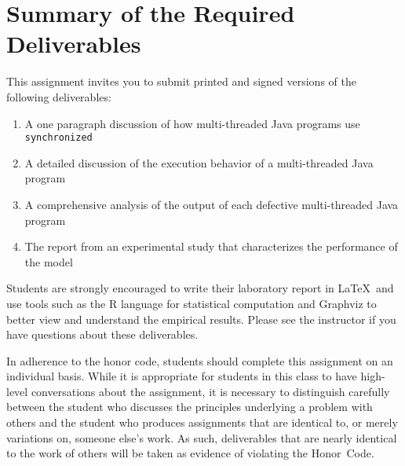 \section*{Summary of the Required Deliverables}

This assignment invites you to submit printed and signed versions of the following deliverables: 

  \begin{enumerate}
    \item A one paragraph discussion of how multi-threaded Java programs use {\tt synchronized} 
    \item A detailed discussion of the execution behavior of a multi-threaded Java program
    \item A comprehensive analysis of the output of each defective multi-threaded Java program
    \item The report from an experimental study that characterizes the performance of the model 
  \end{enumerate}

Students are strongly encouraged to write their laboratory report in \LaTeX~and use tools such as the R language for statistical
computation and Graphviz to better view and understand the empirical results. Please see the instructor if you have questions
about these deliverables.

In adherence to the honor code, students should complete this assignment on an individual basis. While it is appropriate for
students in this class to have high-level conversations about the assignment, it is necessary to distinguish carefully between the
student who discusses the principles underlying a problem with others and the student who produces assignments that are identical
to, or merely variations on, someone else's work.  As such, deliverables that are nearly identical to the work of others will be
taken as evidence of violating the \mbox{Honor Code}.  



  
